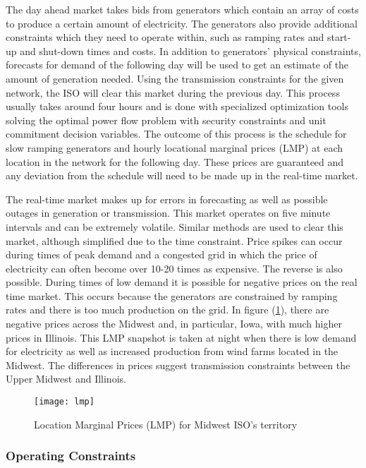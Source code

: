 The day ahead market takes bids from generators which contain an array of costs to produce a certain amount of electricity.  The generators also provide additional constraints which they need to operate within, such as ramping rates and start-up and shut-down times and costs.  In addition to generators' physical constraints, forecasts for demand of the following day will be used to get an estimate of the amount of generation needed.  Using the transmission constraints for the given network, the ISO will clear this market during the previous day.  This process usually takes around four hours and is done with specialized optimization tools solving the optimal power flow problem with security constraints and unit commitment decision variables.  The outcome of this process is the schedule for slow ramping generators and hourly locational marginal prices (LMP) at each location in the network for the following day.  These prices are guaranteed and any deviation from the schedule will need to be made up in the real-time market.	

The real-time market makes up for errors in forecasting as well as possible outages in generation or transmission.  This market operates on five minute intervals and can be extremely volatile.  Similar methods are used to clear this market, although simplified due to the time constraint.  Price spikes can occur during times of peak demand and a congested grid in which the price of electricity can often become over 10-20 times as expensive.  The reverse is also possible.  During times of low demand it is possible for negative prices on the real time market.  This occurs because the generators are constrained by ramping rates and there is too much production on the grid. In figure (\ref{fig:lmpmiso}), there are negative prices across the Midwest and, in particular, Iowa, with much higher prices in Illinois.  This LMP snapshot is taken at night when there is low demand for electricity as well as increased production from wind farms located in the Midwest.  The differences in prices suggest transmission constraints between the Upper Midwest and Illinois.   


\begin{figure}
\centering
\texttt{[image: lmp]}  
\caption{Location Marginal Prices (LMP) for Midwest ISO's territory}
\label{fig:lmpmiso}
\end{figure}


\subsubsection{Operating Constraints}


